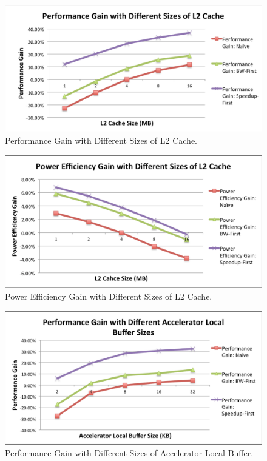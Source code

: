 \begin{figure}
    \centering
    \includegraphics[width=4.5in]{L2-Cache-Performance}
    \caption{Performance Gain with Different Sizes of L2 Cache.}
    \label{fig_l2_perf}
\end{figure}

\begin{figure}
    \centering
    \includegraphics[width=4.5in]{L2-Cache-Power}
    \caption{Power Efficiency Gain with Different Sizes of L2 Cache.}
    \label{fig_l2_power}
\end{figure}

\begin{figure}
    \centering
    \includegraphics[width=4.5in]{Acc-Buffer-Performance}
    \caption{Performance Gain with Different Sizes of Accelerator Local Buffer.}
    \label{fig_acc_buffer_perf}
\end{figure}

